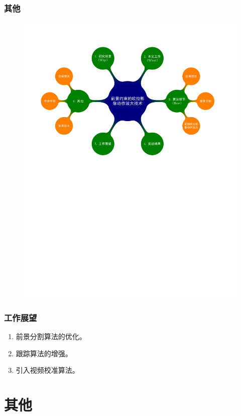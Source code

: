 \documentclass[xcolor=svgnames,serif,table,10pt]{beamer}
\begin{document}
\begin{frame}
  \frametitle{其他}
  \vspace{-2.5em}
  \begin{figure}
    \centering
    \includegraphics[width=\textwidth, page=9]{mindmap.pdf}
  \end{figure}
\end{frame}

\begin{frame}
  \frametitle{工作展望}
  \begin{enumerate}[<+->]
  \item 前景分割算法的优化。
  \item 跟踪算法的增强。
  \item 引入视频校准算法。
  \end{enumerate}
\end{frame}

\section{其他}
\end{document}
